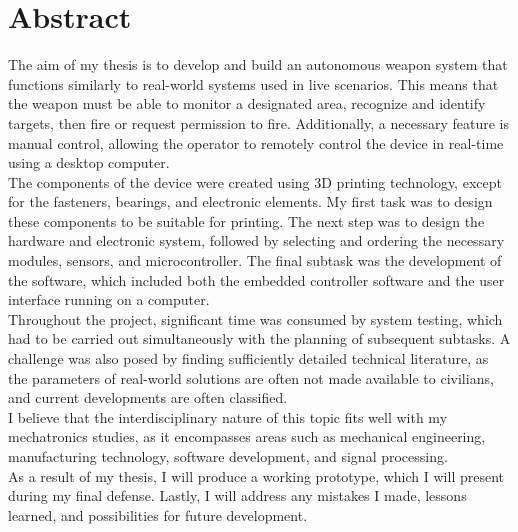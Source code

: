 \vfill
\selectenglish


\chapter*{Abstract}

The aim of my thesis is to develop and build an autonomous weapon system that functions similarly to real-world systems used in live scenarios. This means that the weapon must be able to monitor a designated area, recognize and identify targets, then fire or request permission to fire. Additionally, a necessary feature is manual control, allowing the operator to remotely control the device in real-time using a desktop computer.\\

The components of the device were created using 3D printing technology, except for the fasteners, bearings, and electronic elements. My first task was to design these components to be suitable for printing. The next step was to design the hardware and electronic system, followed by selecting and ordering the necessary modules, sensors, and microcontroller. The final subtask was the development of the software, which included both the embedded controller software and the user interface running on a computer.\\

Throughout the project, significant time was consumed by system testing, which had to be carried out simultaneously with the planning of subsequent subtasks. A challenge was also posed by finding sufficiently detailed technical literature, as the parameters of real-world solutions are often not made available to civilians, and current developments are often classified.\\

I believe that the interdisciplinary nature of this topic fits well with my mechatronics studies, as it encompasses areas such as mechanical engineering, manufacturing technology, software development, and signal processing.\\

As a result of my thesis, I will produce a working prototype, which I will present during my final defense. Lastly, I will address any mistakes I made, lessons learned, and possibilities for future development.

\vfill
\selectthesislanguage

\setcounter{romanPage}{\value{page}}
